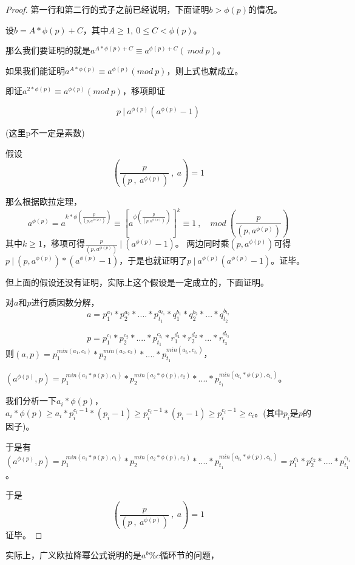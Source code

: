 \begin{proof}
	第一行和第二行的式子之前已经说明，下面证明$b>\phi(p)$的情况。
	
	设$b = A*\phi(p) + C$，其中$A\ge1,\ 0\le C<\phi(p)$。
	
	那么我们要证明的就是$a^{ A*\phi(p) + C} \equiv  a^{\phi(p)+C}(\ mod\ p)$。
	
	如果我们能证明$a^{A*\phi(p)} \equiv a^{\phi(p)}( mod\ p)$，则上式也就成立。
	
	即证$a^{2*\phi(p)} \equiv a^{\phi(p)}( mod\ p)$，移项即证
	
	$$p\ |\  a^{\phi(p)}(a^{\phi(p)}-1)$$
	
	(这里p不一定是素数)
	
	假设
	$$
	(\frac{p}{(p\ ,\ a^{\phi(p)})}\ ,\ a)= 1
	$$
	
	那么根据欧拉定理，
	$$
	a^{\phi(p)} = a^{k*\phi(\frac{p}{ {(p,a^{\phi(p)})}})}\equiv {[a^{\phi(\frac{p}{ {(p,a^{\phi(p)})}})}]}^k \equiv 1 \ ,\quad mod\ (\frac{p}{(p,a^{\phi(p)})})
	$$
	其中$k\ge 1$，移项可得$\frac{p}{(p,a^{\phi(p)})}\ |\ (a^{\phi(p) }- 1)$。
	两边同时乘${(p,a^{\phi(p)})}$可得$p\ |\  {(p,a^{\phi(p)})}*(a^{\phi(p)}-1)$，于是也就证明了$p\ |\  a^{\phi(p)}(a^{\phi(p)}-1)$。证毕。
	
	但上面的假设还没有证明，实际上这个假设是一定成立的，下面证明。
	
	对$a$和$p$进行质因数分解，
	$$
		a = p^{a_1}_1*p^{a_2}_2*....*p^{a_{t_1}}_{t_1} * q^{b_1}_1* q^{b_2}_2*...* q^{b_{t_2}}_{t_2}
	$$
	
	$$
		p = p^{c_1}_1*p^{c_2}_2*....*p^{c_{t_1}}_{t_1} *  r^{d_1}_1* r^{d_2}_2*...* r^{d_{t_3}}_{t_3}
	$$
	则$(a,p) = p^{min(a_1,c_1)}_1*p^{min(a_2,c_2)}_2*....*p^{{min(a_{t_1},c_{t_1})}}_{t_1}$，
	
	$(a^{\phi(p)},p) =  p^{min(a_1*\phi(p),c_1)}_1*p^{min(a_2*\phi(p),c_2)}_2*....*p^{{min(a_{t_1}*\phi(p),c_{t_1})}}_{t_1}$。
	
	我们分析一下$a_i*\phi(p)$，$a_i*\phi(p)\ge a_i*p_i^{c_i-1}*(p_i-1) \ge p_i^{c_i-1}*(p_i-1) \ge p_i^{c_i-1}\ge c_i$。(其中$p_i$是$p$的因子)。
	
	于是有$(a^{\phi(p)},p) =  p^{min(a_1*\phi(p),c_1)}_1*p^{min(a_2*\phi(p),c_2)}_2*....*p^{{min(a_{t_1}*\phi(p),c_{t_1})}}_{t_1} = p^{c_1}_1*p^{c_2}_2*....*p^{c_{t_1}}_{t_1}$。
	
	于是
	$$
		(\frac{p}{(p\ ,\ a^{\phi(p)})}\ ,\ a)= 1
	$$
	证毕。
\end{proof}

实际上，广义欧拉降幂公式说明的是$a^b\%c$循环节的问题，

